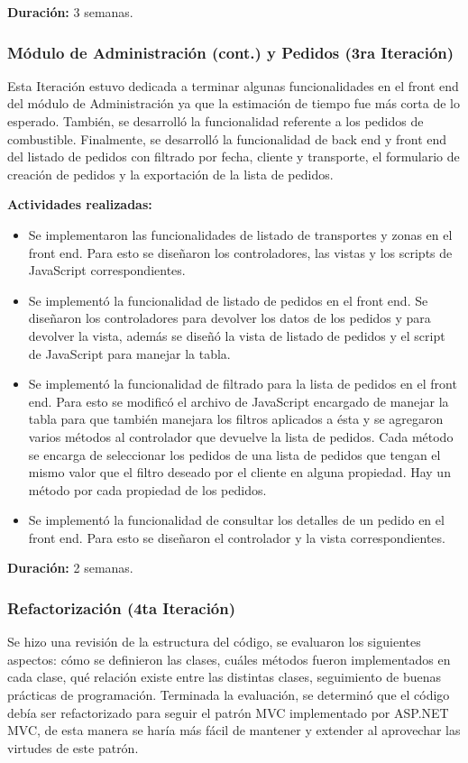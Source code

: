 \textbf{Duración:} 3 semanas.

\subsubsection{Módulo de Administración (cont.) y Pedidos (3ra Iteración)}
Esta Iteración estuvo dedicada a terminar algunas funcionalidades en el front end del módulo de Administración ya que la estimación de tiempo fue más corta de lo esperado. También, se desarrolló la funcionalidad referente a los pedidos de combustible. Finalmente, se desarrolló la funcionalidad de back end y front end del listado de pedidos con filtrado por fecha, cliente y transporte, el formulario de creación de pedidos y la exportación de la lista de pedidos.

\pagebreak
\textbf{Actividades realizadas:}
\begin{itemize}
    \item Se implementaron las funcionalidades de listado de transportes y zonas en el front end. Para esto se diseñaron los controladores, las vistas y los scripts de JavaScript correspondientes.
    \item Se implementó la funcionalidad de listado de pedidos en el front end. Se diseñaron los controladores para devolver los datos de los pedidos y para devolver la vista, además se diseñó la vista de listado de pedidos y el script de JavaScript para manejar la tabla.
    \item Se implementó la funcionalidad de filtrado para la lista de pedidos en el front end. Para esto se modificó el archivo de JavaScript encargado de manejar la tabla para que también manejara los filtros aplicados a ésta y se agregaron varios métodos al controlador que devuelve la lista de pedidos. Cada método se encarga de seleccionar los pedidos de una lista de pedidos que tengan el mismo valor que el filtro deseado por el cliente en alguna propiedad. Hay un método por cada propiedad de los pedidos.
    \item Se implementó la funcionalidad de consultar los detalles de un pedido en el front end. Para esto se diseñaron el controlador y la vista correspondientes.
\end{itemize}

\textbf{Duración:} 2 semanas.

\subsubsection{Refactorización (4ta Iteración)} \label{refactorizacion}
Se hizo una revisión de la estructura del código, se evaluaron los siguientes aspectos: cómo se definieron las clases, cuáles métodos fueron implementados en cada clase, qué relación existe entre las distintas clases, seguimiento de buenas prácticas de programación. Terminada la evaluación, se determinó que el código debía ser refactorizado para seguir el patrón MVC implementado por ASP.NET MVC, de esta manera se haría más fácil de mantener y extender al aprovechar las virtudes de este patrón.

